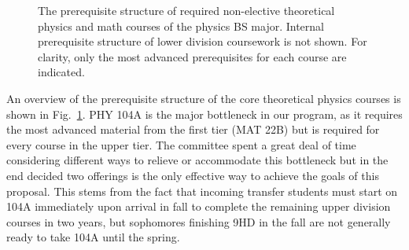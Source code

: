 \documentclass[12pt]{article}
\begin{document}
\begin{figure}
\begin{center}

\caption{\label{fig:prereqs} The prerequisite structure of required
  non-elective theoretical physics and math courses of the physics BS
  major.  Internal prerequisite structure of lower division coursework
  is not shown.  For clarity, only the most advanced prerequisites for
  each course are indicated.}
\end{center}
\end{figure}

An overview of the prerequisite structure of the core theoretical
physics courses is shown in Fig.~\ref{fig:prereqs}.  PHY 104A is the
major bottleneck in our program, as it requires the most advanced
material from the first tier (MAT 22B) but is required for every
course in the upper tier.  The committee spent a great deal of time
considering different ways to relieve or accommodate this bottleneck
but in the end decided two offerings is the only effective way to
achieve the goals of this proposal.  This stems from the fact that
incoming transfer students must start on 104A immediately upon arrival
in fall to complete the remaining upper division courses in two years,
but sophomores finishing 9HD in the fall are not generally ready to
take 104A until the spring.
\end{document}
